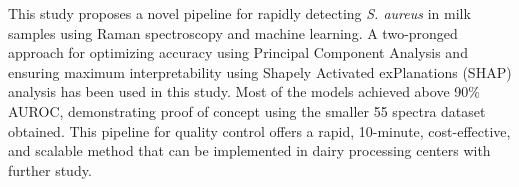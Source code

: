 
This study proposes a novel pipeline for rapidly detecting \textit{S. aureus} in milk samples using Raman spectroscopy and machine learning. A two-pronged approach for optimizing accuracy using Principal Component Analysis and ensuring maximum interpretability using Shapely Activated exPlanations (SHAP) analysis has been used in this study. Most of the models achieved above 90\% AUROC, demonstrating proof of concept using the smaller 55 spectra dataset obtained. This pipeline for quality control offers a rapid, 10-minute, cost-effective, and scalable method that can be implemented in dairy processing centers with further study.

 